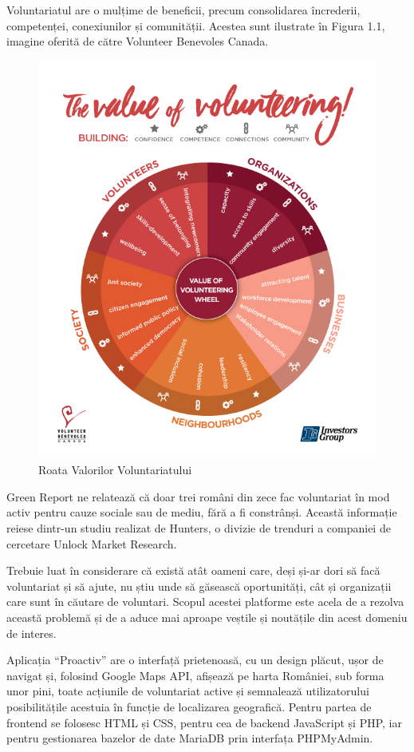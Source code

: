 \documentclass[12pt,a4paper]{report}
\begin{document}
\newpage
Voluntariatul are o mulțime de beneficii, precum consolidarea încrederii, competenței, conexiunilor și comunității. Acestea sunt ilustrate în Figura 1.1, imagine oferită de către Volunteer Benevoles Canada\cite{VBC}.
\begin{figure}[H]
\centering
  \includegraphics[width=0.7\linewidth]{./imagini/VC_ValueOfVolunteering.jpg}
  \caption{Roata Valorilor Voluntariatului}
\end{figure}

\par
Green Report\cite{greenr} ne relatează că doar trei români din zece fac voluntariat în mod activ pentru cauze sociale sau de mediu, fără a fi constrânși. Această informație reiese dintr-un studiu realizat de Hunters, o divizie de trenduri a companiei de cercetare Unlock Market Research.
\\ \par
Trebuie luat în considerare că există atât oameni care, deși și-ar dori să facă voluntariat și să ajute, nu știu unde să găsească oportunități, cât și organizații care sunt în căutare de voluntari. Scopul acestei platforme este acela de a rezolva această problemă și de a aduce mai aproape veștile și noutățile din acest domeniu de interes.
\\ \par
Aplicația “Proactiv” are o interfață prietenoasă, cu un design plăcut, ușor de navigat și, folosind Google Maps API, afișează pe harta României, sub forma unor pini, toate acțiunile de voluntariat active și semnalează utilizatorului posibilitățile acestuia în funcție de localizarea geografică. Pentru partea de frontend se folosesc HTML și CSS, pentru cea de backend JavaScript și PHP, iar pentru gestionarea bazelor de date MariaDB prin interfața PHPMyAdmin.
\end{document}
